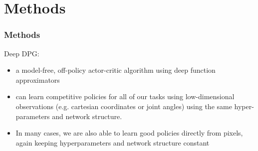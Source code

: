 \section{Methods}

\begin{frame}
\frametitle{Methods}

Deep DPG:
\begin{itemize}
  \item a model-free, off-policy actor-critic algorithm using deep function approximators
  \item can learn competitive policies for all of our tasks using low-dimensional observations
  (e.g. cartesian coordinates or joint angles) using the same hyper-parameters and network structure.
  \item In many cases, we are also able to learn good policies directly from pixels, again keeping hyperparameters and network structure constant
\end{itemize}

\end{frame}

